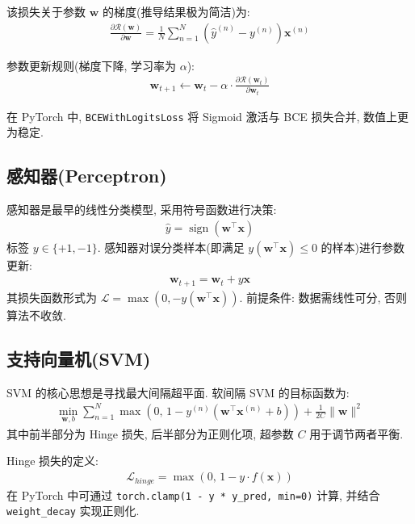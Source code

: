\documentclass{../../nndlcourse}
\begin{document}
该损失关于参数 $\boldsymbol{w}$ 的梯度(推导结果极为简洁)为: 
\begin{align}
    \frac{\partial \mathcal{R}(\boldsymbol{w})}{\partial \boldsymbol{w}} = \frac{1}{N}\sum_{n=1}^N \left(\hat{y}^{(n)} - y^{(n)}\right)\boldsymbol{x}^{(n)}
\end{align}

参数更新规则(梯度下降, 学习率为 $\alpha$): 
\begin{align}
    \boldsymbol{w}_{t+1} \leftarrow \boldsymbol{w}_t - \alpha \cdot \frac{\partial \mathcal{R}(\boldsymbol{w}_t)}{\partial \boldsymbol{w}_t}
\end{align}

在 PyTorch 中, \texttt{BCEWithLogitsLoss} 将 Sigmoid 激活与 BCE 损失合并, 数值上更为稳定.

\subsection{感知器(Perceptron)}

感知器是最早的线性分类模型, 采用符号函数进行决策: 
\begin{align}
    \hat{y} = \operatorname{sign}\left(\boldsymbol{w}^\top \boldsymbol{x}\right)
\end{align}
标签 $y \in \{+1, -1\}$. 感知器对误分类样本(即满足 $y\left(\boldsymbol{w}^\top\boldsymbol{x}\right) \le 0$ 的样本)进行参数更新: 
\begin{align}
    \boldsymbol{w}_{t+1} = \boldsymbol{w}_t + y\boldsymbol{x}
\end{align}
其损失函数形式为 $\mathcal{L} = \max(0, -y(\boldsymbol{w}^\top\boldsymbol{x}))$. 前提条件: 数据需线性可分, 否则算法不收敛.

\subsection{支持向量机(SVM)}

SVM 的核心思想是寻找最大间隔超平面. 软间隔 SVM 的目标函数为: 
\begin{align}
    \min_{\boldsymbol{w}, b} \sum_{n=1}^N \max\left(0,\, 1 - y^{(n)}\left(\boldsymbol{w}^\top\boldsymbol{x}^{(n)} + b\right)\right) + \frac{1}{2C}\|\boldsymbol{w}\|^2
\end{align}
其中前半部分为 Hinge 损失, 后半部分为正则化项, 超参数 $C$ 用于调节两者平衡.

Hinge 损失的定义: 
\begin{align}
    \mathcal{L}_{hinge} = \max\left(0,\, 1 - y\cdot f(\boldsymbol{x})\right)
\end{align}
在 PyTorch 中可通过 \texttt{torch.clamp(1 - y * y\_pred, min=0)} 计算, 并结合 \texttt{weight\_decay} 实现正则化.
\end{document}
